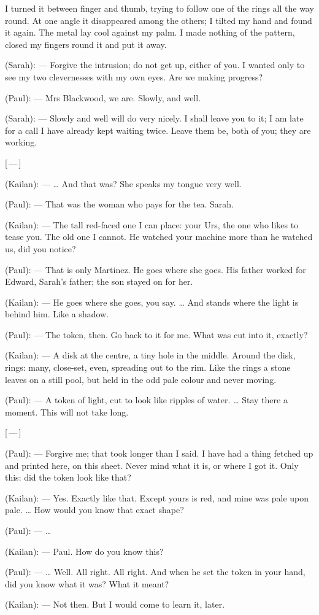 I turned it between finger and thumb, trying to follow one of the rings all the way round. At one angle it disappeared among the others; I tilted my hand and found it again. The metal lay cool against my palm. I made nothing of the pattern, closed my fingers round it and put it away.\par

\begin{room}

(Sarah): --- Forgive the intrusion; do not get up, either of you. I wanted only to see my two clevernesses with my own eyes. Are we making progress?

(Paul): --- Mrs Blackwood, we are. Slowly, and well.

(Sarah): --- Slowly and well will do very nicely. I shall leave you to it; I am late for a call I have already kept waiting twice. Leave them be, both of you; they are working.

\centerline{[\,---\,]}

(Kailan): --- \ldots{} And that was? She speaks my tongue very well.

(Paul): --- That was the woman who pays for the tea. Sarah.

(Kailan): --- The tall red-faced one I can place: your Urs, the one who likes to tease you. The old one I cannot. He watched your machine more than he watched us, did you notice?

(Paul): --- That is only Martinez. He goes where she goes. His father worked for Edward, Sarah's father; the son stayed on for her.

(Kailan): --- He goes where she goes, you say. \ldots{} And stands where the light is behind him. Like a shadow.

(Paul): --- The token, then. Go back to it for me. What was cut into it, exactly?

(Kailan): --- A disk at the centre, a tiny hole in the middle. Around the disk, rings: many, close-set, even, spreading out to the rim. Like the rings a stone leaves on a still pool, but held in the odd pale colour and never moving.

(Paul): --- A token of light, cut to look like ripples of water. \ldots{} Stay there a moment. This will not take long.

\centerline{[\,---\,]}

(Paul): --- Forgive me; that took longer than I said. I have had a thing fetched up and printed here, on this sheet. Never mind what it is, or where I got it. Only this: did the token look like that?

(Kailan): --- Yes. Exactly like that. Except yours is red, and mine was pale upon pale. \ldots{} How would you know that exact shape?

(Paul): --- \ldots{}

(Kailan): --- Paul. How do you know this?

(Paul): --- \ldots{} Well. All right. All right. And when he set the token in your hand, did you know what it was? What it meant?

(Kailan): --- Not then. But I would come to learn it, later.

\end{room}

